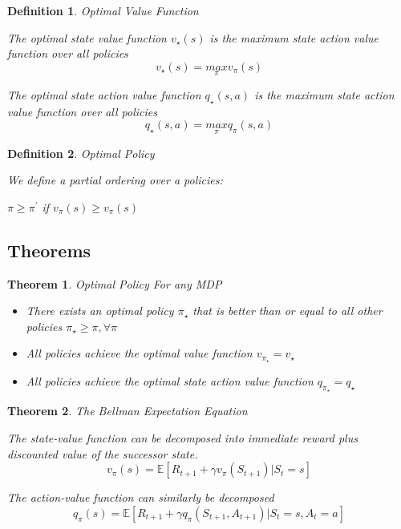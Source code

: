 \documentclass[12pt,a4paper]{article}
\newtheorem{definition}{Definition}
\newtheorem{theorem}{Theorem}
\begin{document}
\begin{definition}{Optimal Value Function}

The optimal state value function $v_{\star}(s)$ is the maximum state action value function over all policies
\[ 
v_{\star}(s) = \underset{\pi}{max}{v_{\pi}(s)}
\]

The optimal state action value function $q_{\star}(s, a)$ is the maximum state action value function over all policies
\[ 
q_{\star}(s, a) = \underset{\pi}{max}{q_{\pi}(s, a)}
\]
\end{definition}

\begin{definition}{Optimal Policy}

We define a partial ordering over a policies:

$\pi \geq \pi^{\prime}$ if $v_{\pi}(s) \geq  v_{\pi}(s)$

\end{definition}

\subsection{Theorems}

\begin{theorem}{Optimal Policy}
For any MDP
\begin{itemize}
\item There exists an optimal policy $\pi_{\star}$ that is better than or equal to all other policies $\pi_{\star} \geq \pi,\forall\pi $
\item All policies achieve the optimal value function $v_{\pi_{\star}} = v_{\star}$
\item All policies achieve the optimal state action value function $q_{\pi_{\star}} = q_{\star}$
\end{itemize}
\end{theorem}

\begin{theorem}{The Bellman Expectation Equation}

The state-value function can be decomposed into immediate reward plus discounted value of the successor state.
\[ 
v_{\pi}(s) = \mathbb{E}[R_{t+1} + \gamma v_{\pi}(S_{t+1})  \vert S_{t}=s]
\]

The action-value function can similarly be decomposed
\[ 
q_{\pi}(s) = \mathbb{E}[R_{t+1} + \gamma q_{\pi}(S_{t+1}, A_{t+1}) \vert S_{t}=s, A_{t}=a]
\]


\end{theorem}
\end{document}
